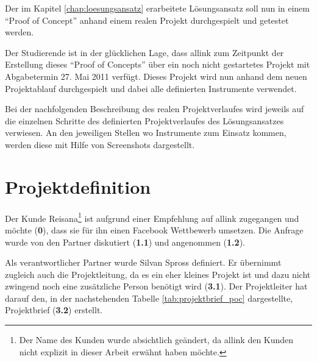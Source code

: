Der im Kapitel \ref{chap:loesungsansatz} erarbeitete Lösungsansatz soll nun
in einem ``Proof of Concept'' anhand einem realen Projekt durchgespielt und getestet
werden.

Der Studierende ist in der glücklichen Lage, dass allink zum Zeitpunkt der
Erstellung dieses ``Proof of Concepts'' über ein noch nicht gestartetes Projekt 
mit Abgabetermin 27. Mai 2011 verfügt. Dieses Projekt wird nun anhand dem neuen
Projektablauf durchgespielt und dabei alle definierten Instrumente verwendet.

Bei der nachfolgenden Beschreibung des realen Projektverlaufes wird jeweils auf
die einzelnen Schritte des definierten Projektverlaufes des Lösungsansatzes
verwiesen. An den jeweiligen Stellen wo Instrumente zum Einsatz kommen, werden
diese mit Hilfe von Screenshots dargestellt.

\section{Projektdefinition}
Der Kunde Reisana\footnote{Der Name des Kunden wurde absichtlich geändert, da
allink den Kunden nicht explizit in dieser Arbeit erwähnt haben möchte.} ist aufgrund 
einer Empfehlung auf allink zugegangen und möchte (\textbf{0}), dass sie für ihn 
einen Facebook Wettbewerb umsetzen. Die Anfrage wurde von den Partner diskutiert 
(\textbf{1.1}) und angenommen (\textbf{1.2}).

Als verantwortlicher Partner wurde Silvan Spross definiert. Er übernimmt
zugleich auch die Projektleitung, da es ein eher kleines Projekt ist und dazu
nicht zwingend noch eine zusätzliche Person benötigt wird (\textbf{3.1}). Der 
Projektleiter hat darauf den, in der nachstehenden Tabelle \ref{tab:projektbrief_poc} dargestellte,
Projektbrief (\textbf{3.2}) erstellt.

